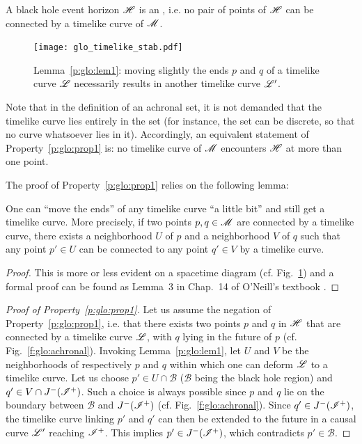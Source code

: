 \begin{prop}
\label{p:glo:prop1}
A black hole event horizon $\mathscr{H}$ is an , i.e. no pair of points of $\mathscr{H}$ can be connected
by a timelike curve of $\mathscr{M}$.
\end{prop}

\begin{figure}
\centerline{\texttt{[image: glo\_timelike\_stab.pdf]}}
\caption[]{\label{f:glo:timelike_stab} \footnotesize
Lemma~\ref{p:glo:lem1}: moving slightly the ends $p$ and $q$ of a timelike curve $\mathscr{L}$
necessarily results in another timelike curve $\mathscr{L}'$.}
\end{figure}

Note that in the definition of an achronal set, it is not demanded that the timelike
curve lies entirely in the set (for instance, the set can be discrete, so that no curve
whatsoever lies in it). Accordingly,
an equivalent statement of Property~\ref{p:glo:prop1} is: no timelike curve of $\mathscr{M}$
encounters $\mathscr{H}$ at more than one point.

The proof of Property~\ref{p:glo:prop1} relies on the following lemma:
\begin{lemma}
\label{p:glo:lem1}
One can ``move the ends'' of any timelike curve
``a little bit'' and still get a timelike curve. More precisely,
if two points $p,q\in\mathscr{M}$ are connected by a timelike curve,
there exists
a neighborhood $U$ of $p$ and a neighborhood $V$ of $q$ such that
any point $p'\in U$ can be connected to any point $q'\in V$ by a timelike curve.
\end{lemma}
\begin{proof}
This is more or less evident on a spacetime diagram (cf. Fig.~\ref{f:glo:timelike_stab})
and a formal proof
can be found as Lemma~3 in Chap.~14 of O'Neill's textbook \cite{ONeil83}.
\end{proof}

\begin{proof}[Proof of Property~\ref{p:glo:prop1}]
Let us assume the negation of Property~\ref{p:glo:prop1}, i.e. that there exists two points
$p$ and $q$
in $\mathscr{H}$ that are connected by a timelike curve $\mathscr{L}$, with $q$
lying in the future of $p$ (cf. Fig.~\ref{f:glo:achronal}).
Invoking Lemma~\ref{p:glo:lem1}, let $U$ and $V$ be the neighborhoods of respectively
$p$ and $q$ within which one can deform $\mathscr{L}$ to a timelike curve.
Let us choose $p'\in U\cap\mathscr{B}$ ($\mathscr{B}$ being the black hole region)
and $q'\in V\cap J^-(\mathscr{I}^+)$. Such a choice is
always possible since $p$ and $q$ lie on the boundary between $\mathscr{B}$
and $J^-(\mathscr{I}^+)$ (cf. Fig.~\ref{f:glo:achronal}).
Since $q'\in J^-(\mathscr{I}^+)$, the timelike curve linking $p'$ and $q'$ can then be extended to the future in a causal curve $\mathscr{L}'$ reaching $\mathscr{I}^+$. This implies $p'\in J^-(\mathscr{I}^+)$,
which contradicts $p'\in\mathscr{B}$.
\end{proof}

